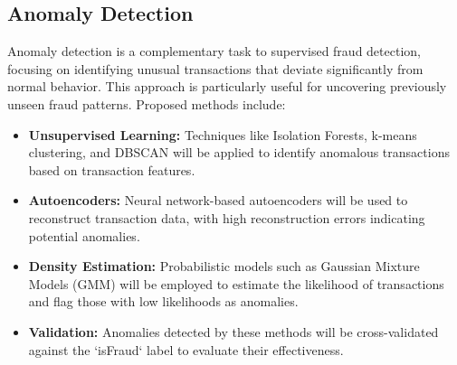\documentclass[12pt,a4paper, hidelinks]{article}
\begin{document}
\subsection{Anomaly Detection}
Anomaly detection is a complementary task to supervised fraud detection, focusing on identifying unusual transactions that deviate significantly from normal behavior. This approach is particularly useful for uncovering previously unseen fraud patterns. Proposed methods include:
\begin{itemize}
    \item \textbf{Unsupervised Learning:} Techniques like Isolation Forests, k-means clustering, and DBSCAN will be applied to identify anomalous transactions based on transaction features. 
    \item \textbf{Autoencoders:} Neural network-based autoencoders will be used to reconstruct transaction data, with high reconstruction errors indicating potential anomalies.
    \item \textbf{Density Estimation:} Probabilistic models such as Gaussian Mixture Models (GMM) will be employed to estimate the likelihood of transactions and flag those with low likelihoods as anomalies.
    \item \textbf{Validation:} Anomalies detected by these methods will be cross-validated against the `isFraud` label to evaluate their effectiveness.
\end{itemize}

\end{document}
